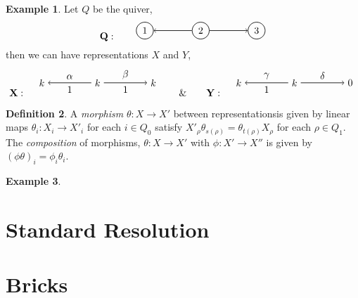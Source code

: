 \documentclass[11.5pt, twoside, a4paper, titlepage]{report}
\providecommand{\equ}[0]{\begin{equation*}}
\providecommand{\eequ}[0] {\end{equation*}}
\theoremstyle{definition}
\newtheorem{mydef}{Definition}[section]
\newtheorem{eg}[mydef]{Example}
\theoremstyle{plain}
\begin{document}
\begin{eg}
Let $Q$ be the quiver, 
\equ
\mathbf{Q}: \qquad
\begin{tikzpicture}[->,-latex, auto, every path/.style={->, semithick}, main node/.style={draw, circle}]
\node	[main node]		(1) at (0,0)		{1};
\node [main node]		(2) at (2,0)		{2};
\node [main node]		(3) at (4,0)		{3};

\draw (2) edge (1);
\draw (2) edge (3);
\end{tikzpicture}
\eequ
then we can have representations $X$ and $Y$, 
\equ
\mathbf{X}: \quad
\begin{tikzpicture}[->,-latex, auto, every path/.style={->, semithick}, main node/.style={draw, circle}]
\node	[]		(1) at (0,0)		{$k$};
\node []		(2) at (2,0)		{$k$};
\node []		(3) at (4,0)		{$k$};

\draw (2) edge node [auto, swap] {$\alpha$} node [auto] {1} (1);
\draw (2) edge node [auto] {$\beta$} node [auto, swap] {1} (3);
\end{tikzpicture}
\qquad \& \qquad
\mathbf{Y}: \quad
\begin{tikzpicture}[->,-latex, auto, every path/.style={->, semithick}, main node/.style={draw, circle}]
\node	[]		(1) at (0,0)		{$k$};
\node []		(2) at (2,0)		{$k$};
\node []		(3) at (4,0)		{$0$};

\draw (2) edge node [auto, swap] {$\gamma$} node [auto] {1} (1);
\draw (2) edge node [auto] {$\delta$} (3);
\end{tikzpicture}
\eequ
\end{eg}

\begin{mydef}
A \emph{morphism} $\theta: X \to X'$ between representationsis given by linear maps $\theta_i:X_i \to X'_i$ for each $i\in Q_0$ satisfy $X'_{\rho}\theta _{s(\rho)} = \theta_{t(\rho)}X_{\rho}$ for each $\rho \in Q_1$. The \emph{composition} of morphisms, $\theta: X \to X'$ with $\phi: X' \to X''$ is given by $(\phi \theta)_i=\phi_i \theta_i$.
\end{mydef}

\begin{eg}
\end{eg}





\section{Standard Resolution}

\section{Bricks}
\end{document}
